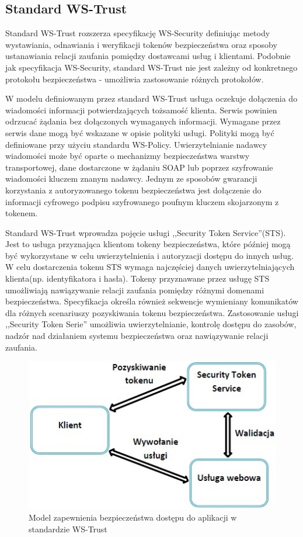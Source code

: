 	\subsection{Standard WS-Trust}

		Standard WS-Trust rozszerza specyfikację WS-Security definiując metody wystawiania, odnawiania i weryfikacji tokenów bezpieczeństwa oraz sposoby ustanawiania relacji zaufania pomiędzy dostawcami usług i klientami. Podobnie jak specyfikacja WS-Security, standard WS-Trust nie jest zależny od konkretnego protokołu bezpieczeństwa - umożliwia zastosowanie różnych protokołów\cite{WS-Trust-1.4-with-errata}.

		W modelu definiowanym przez standard WS-Trust usługa oczekuje dołączenia do wiadomości informacji potwierdzających tożsamość klienta. Serwis powinien odrzucać żądania bez dołączonych wymaganych informacji. Wymagane przez serwis dane mogą być wskazane w opisie polityki usługi. Polityki mogą być definiowane przy użyciu standardu WS-Policy. Uwierzytelnianie nadawcy wiadomości może być oparte o mechanizmy bezpieczeństwa warstwy transportowej, dane dostarczone w żądaniu SOAP lub poprzez szyfrowanie wiadomości kluczem znanym nadawcy. Jednym ze sposobów gwarancji korzystania z autoryzowanego tokenu bezpieczeństwa jest dołączenie do informacji cyfrowego podpisu szyfrowanego poufnym kluczem skojarzonym z tokenem.

		Standard WS-Trust wprowadza pojęcie usługi ,,Security Token Service''(STS). Jest to usługa przyznająca klientom tokeny bezpieczeństwa, które później mogą być wykorzystane w celu uwierzytelnienia i autoryzacji dostępu do innych usług. W celu dostarczenia tokenu STS wymaga najczęściej danych uwierzytelniających klienta(np. identyfikatora i hasła). Tokeny przyznawane przez usługę STS umożliwiają nawiązywanie relacji zaufania pomiędzy różnymi domenami bezpieczeństwa. Specyfikacja określa również sekwencje wymieniany komunikatów dla różnych scenariuszy pozyskiwania tokenu bezpieczeństwa. Zastosowanie usługi ,,Security Token Serie'' umożliwia uwierzytelnianie, kontrolę dostępu do zasobów, nadzór nad działaniem systemu bezpieczeństwa oraz nawiązywanie relacji zaufania.

		\begin{figure}[h]
			\centering
				\includegraphics{img/ws-trust.jpg}
			\caption{Model zapewnienia bezpieczeństwa dostępu do aplikacji w standardzie WS-Trust}
			\label{Model zapewnienia bezpieczeństwa dostępu do aplikacji w standardzie WS-Trust}
		\end{figure}

